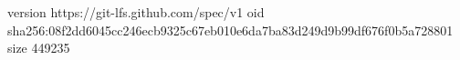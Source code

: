 version https://git-lfs.github.com/spec/v1
oid sha256:08f2dd6045cc246ecb9325c67eb010e6da7ba83d249d9b99df676f0b5a728801
size 449235
